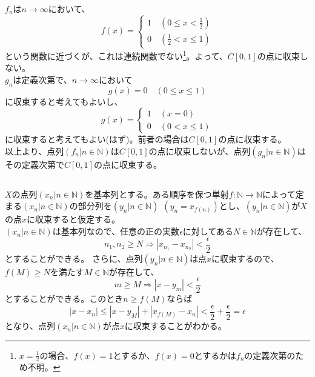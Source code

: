 \documentclass{jsarticle}
\begin{document}
\subsubsection{}
$f_n$は$n\to\infty$において、
\[f(x)=
\begin{cases}
1\quad(0\leq x<\frac{1}{2})\\
0\quad(\frac{1}{2}<x\leq 1)
\end{cases}
\]
という関数に近づくが、これは連続関数でない\footnote{$x=\frac{1}{2}$の場合、$f(x)=1$とするか、$f(x)=0$とするかは$f_n$の定義次第のため不明。}。よって、$C[0,1]$の点に収束しない。\\
$g_n$は定義次第で、$n\to\infty$において
\[g(x)=0 \quad(0\leq x\leq 1)\]
に収束すると考えてもよいし、
\[g(x)=
\begin{cases}
1\quad(x=0)\\
0\quad(0<x\leq 1)
\end{cases}
\]
に収束すると考えてもよい(はず)。前者の場合は$C[0,1]$の点に収束する。\\
以上より、点列$(f_n|n\in\mathbb{N})$は$C[0,1]$の点に収束しないが、点列$(g_n|n\in\mathbb{N})$はその定義次第で$C[0,1]$の点に収束する。


\subsection{}
$X$の点列$(x_n|n\in\mathbb{N})$を基本列とする。ある順序を保つ単射$f:\mathbb{N}\to\mathbb{N}$によって定まる$(x_n|n\in\mathbb{N})$の部分列を$(y_n|n\in\mathbb{N})\ \ (y_n=x_{f(n)})$とし、$(y_n|n\in\mathbb{N})$が$X$の点$x$に収束すると仮定する。\\
$(x_n|n\in\mathbb{N})$は基本列なので、任意の正の実数$\epsilon$に対してある$N\in\mathbb{N}$が存在して、
\[n_1,n_2\geq N\Longrightarrow|x_{n_1}-x_{n_2}|<\frac{\epsilon}{2}\]
とすることができる。
さらに、点列$(y_n|n\in\mathbb{N})$は点$x$に収束するので、$f(M)\geq N$を満たす$M\in\mathbb{N}$が存在して、
\[m\geq M\Longrightarrow |x-y_m|<\frac{\epsilon}{2}\]
とすることができる。このとき$n\geq f(M)$ならば
\[|x-x_n|\leq |x-y_M|+|x_{f(M)}-x_n|<\frac{\epsilon}{2}+\frac{\epsilon}{2}=\epsilon\]
となり、点列$(x_n|n\in\mathbb{N})$が点$x$に収束することがわかる。
\end{document}
